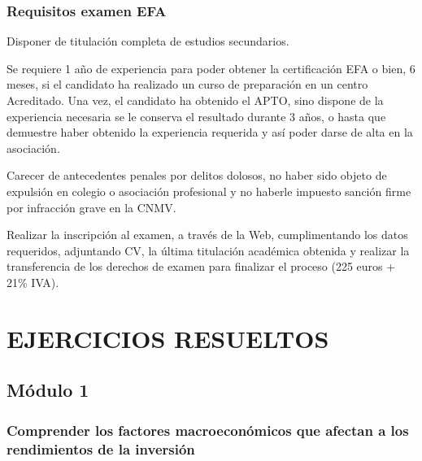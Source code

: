 \documentclass[
  letterpaper,
  DIV=11,
  numbers=noendperiod]{scrreprt}
\begin{document}
\hypertarget{requisitos-examen-efa}{%
\section*{\texorpdfstring{\textbf{Requisitos examen
EFA}}{Requisitos examen EFA}}\label{requisitos-examen-efa}}


Disponer de titulación completa de estudios secundarios.

Se requiere 1 año de experiencia para poder obtener la certificación EFA
o bien, 6 meses, si el candidato ha realizado un curso de preparación en
un centro Acreditado. Una vez, el candidato ha obtenido el APTO, sino
dispone de la experiencia necesaria se le conserva el resultado durante
3 años, o hasta que demuestre haber obtenido la experiencia requerida y
así poder darse de alta en la asociación.

Carecer de antecedentes penales por delitos dolosos, no haber sido
objeto de expulsión en colegio o asociación profesional y no haberle
impuesto sanción firme por infracción grave en la CNMV.

Realizar la inscripción al examen, a través de la Web, cumplimentando
los datos requeridos, adjuntando CV, la última titulación académica
obtenida y realizar la transferencia de los derechos de examen para
finalizar el proceso (225 euros + 21\% IVA).

\part{EJERCICIOS RESUELTOS}

\hypertarget{muxf3dulo-1}{%
\chapter*{Módulo 1}\label{muxf3dulo-1}}


\hypertarget{comprender-los-factores-macroeconuxf3micos-que-afectan-a-los-rendimientos-de-la-inversiuxf3n}{%
\section*{Comprender los factores macroeconómicos que afectan a los
rendimientos de la
inversión}\label{comprender-los-factores-macroeconuxf3micos-que-afectan-a-los-rendimientos-de-la-inversiuxf3n}}
\end{document}
